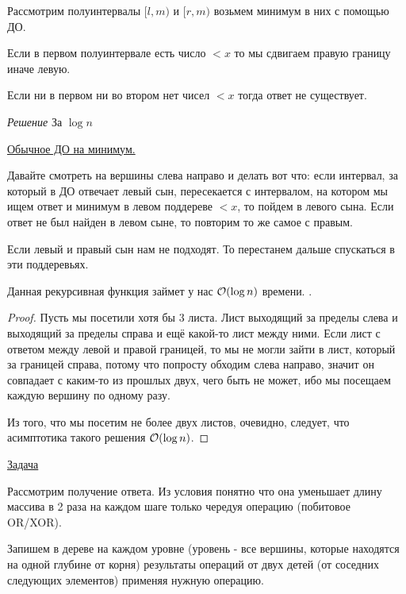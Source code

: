 Рассмотрим полуинтервалы $[l, m)$ и $[r, m)$ возьмем минимум в них с помощью ДО.

Если в первом полуинтервале есть число $< x$ то мы сдвигаем правую границу иначе левую.

Если ни в первом ни во втором нет чисел $< x$ тогда ответ не существует.

{\it Решение } За $\log n$

\href{https://codeforces.com/blog/entry/70625}{Обычное ДО на минимум.}

Давайте смотреть на вершины слева направо и делать вот что: если интервал, за который в ДО отвечает левый сын, пересекается с интервалом, на котором мы ищем ответ и минимум в левом поддереве $<x$, то пойдем в левого сына. Если ответ не был найден в левом сыне, то повторим то же самое с правым.

Если левый и правый сын нам не подходят. То перестанем дальше спускаться в эти поддеревьях.

\begin{Thm}\label{thm@splay}
Данная рекурсивная функция займет у нас $\mathcal{O}(\log n)$ времени.
.\end{Thm}

\begin{proof}
Пусть мы посетили хотя бы 3 листа. Лист выходящий за пределы слева и выходящий за пределы справа и ещё какой-то лист между ними. Если лист с ответом между левой и правой границей, то мы не могли зайти в лист, который за границей справа, потому что попросту обходим слева направо, значит он совпадает с каким-то из прошлых двух, чего быть не может, ибо мы посещаем каждую вершину по одному разу.

Из того, что мы посетим не более двух листов, очевидно, следует, что асимптотика такого решения $\mathcal{O}(\log n)$.
\end{proof}



\href{https://codeforces.com/contest/339/problem/D}{Задача}
\href{https://codeforces.com/contest/339/submission/105829607}{}

Рассмотрим получение ответа. Из условия понятно что она уменьшает длину массива в 2 раза на каждом шаге только чередуя операцию (побитовое OR/XOR). 

Запишем в дереве на каждом уровне (уровень - все вершины, которые находятся на одной глубине от корня) результаты операций от двух детей (от соседних следующих элементов) применяя нужную операцию.

